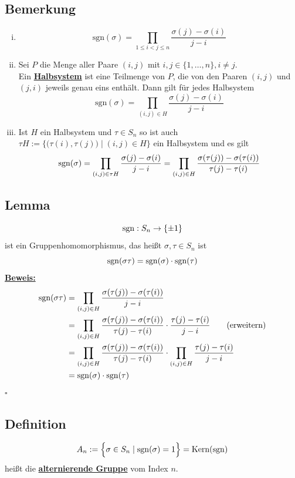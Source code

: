 \subsection{Bemerkung} %
\label{sub:bemerkung}
\begin{enumerate}[(i)]
	\item 
	\[
		\text{sgn}(\sigma)= \prod\limits_{1 \le i < j \le n} \frac{\sigma(j)- \sigma(i)}{j-i} \tag{$= 1 \vee -1$}
	\]
	\item Sei $P$ die Menge aller Paare $(i,j)$ mit $i,j \in \{ 1, \ldots , n\} , i \not= j$. \\
	Ein \underline{\textbf{Halbsystem}} ist eine Teilmenge von $P$, die von den Paaren $(i,j)$ und $ (j,i)$ jeweils genau eins enthält. Dann gilt für jedes
	Halbsystem
	\[
		\text{sgn}(\sigma)= \prod\limits_{(i,j) \in H} \frac{\sigma(j)- \sigma(i)}{j-i} 
	\]
	\item Ist $H$ ein Halbsystem und $\tau \in S_n$ so ist auch $\tau H := \Big\{ \big( \tau(i), \tau(j) \big) \mid (i,j) \in H \Big\}$ ein Halbsystem und es gilt
	\[
		\operatorname{sgn}(\sigma) = \prod\limits_{(i,j) \in \tau H} \frac{\sigma(j)- \sigma(i)}{j-i} = \prod\limits_{(i,j) \in H} 
		\frac{\sigma(\tau(j))- \sigma(\tau(i))}{\tau(j)-\tau(i)}  
	\]
\end{enumerate}

\subsection{Lemma} %
\label{sub:lemma}
\[
	\operatorname{sgn} : S_n \to \{ \pm 1\}
\]
ist ein Gruppenhomomorphismus, das heißt $\sigma, \tau  \in S_n$ ist 
\[
	\operatorname{sgn}(\sigma \tau)= \operatorname{sgn}(\sigma) \cdot \operatorname{sgn}(\tau)
\]
\underline{\textbf{Beweis:}} \\
\begin{align*}
\operatorname{sgn}(\sigma \tau) &= \prod\limits_{(i,j)\in H} \frac{\sigma(\tau(j)) - \sigma( \tau (i))}{j-i} \\
 &= \prod\limits_{(i,j) \in H} \frac{\sigma(\tau(j)) - \sigma( \tau (i))}{\tau(j)- \tau(i)} \cdot \frac{\tau (j) - \tau(i)}{j-i}  \tag{erweitern}\\
&= \prod\limits_{(i,j)\in H} \frac{\sigma(\tau(j))- \sigma(\tau(i))}{\tau(j)- \tau(i)} \cdot \prod\limits_{(i,j) \in H} 
\frac{\tau(j)- \tau(i)}{j-i} \\ &= \operatorname{sgn}(\sigma)\cdot \operatorname{sgn}(\tau)  
\end{align*}
\hfill \( \square \)

\subsection{Definition} %
\label{sub:definition}
\[
	A_n := \Big\{ \sigma \in S_n \mid \operatorname{sgn}(\sigma)=1 \Big\} = \text{Kern}(\operatorname{sgn})
\]
heißt die \underline{\textbf{alternierende Gruppe}} vom Index $n$.

